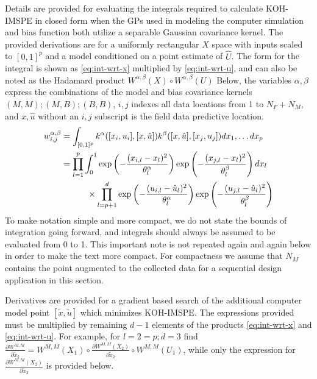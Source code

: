 \documentclass[
]{article}
\begin{document}
Details are provided for evaluating the integrals required to calculate
KOH-IMSPE in closed form when the GPs used in modeling the computer
simulation and bias function both utilize a separable Gaussian covariance kernel. The provided derivations are for a uniformly rectangular \(X\) space with inputs scaled to \([0,1]^p\) and a model conditioned on a point estimate of \(\hat{U}\). The form for the integral is shown as \eqref{eq:int-wrt-x} multiplied by \eqref{eq:int-wrt-u}, and can also be noted as the Hadamard product \(W^{\alpha, \beta}(X) \circ W^{\alpha, \beta}(U)\) Below, the variables \(\alpha,\beta\) express the combinations of the model and bias covariance kernels \((M,M); (M,B); (B,B)\), \(i,j\) indexes all data locations from 1 to \(N_F + N_M\), and \(x,\hat{u}\) without an \(i,j\) subscript is the field data predictive location.
\begin{align}
w^{\alpha, \beta}_{i,j} &= \int_{[0,1]^p} k^{\alpha}([x_i, u_i], [x, \hat{u}])k^{\beta}([x, \hat{u}], [x_j, u_j])dx_1, \dots dx_p \notag \\
&= \prod_{l = 1}^p \int_0^1 \exp\left(-\frac{(x_{i,l} - x_l)^2}{\theta^\alpha_l}\right)\exp\left(-\frac{(x_{j,l} - x_l)^2}{\theta^\beta_l}\right)dx_l \label{eq:int-wrt-x}\\
&\qquad\quad\times\prod_{l = p + 1}^d \exp\left(-\frac{(u_{i,l} - \hat{u}_l)^2}{\theta^\alpha_l}\right)\exp\left(-\frac{(u_{j,l} - \hat{u}_l)^2}{\theta^\beta_l}\right) \label{eq:int-wrt-u}
\end{align}
To make notation simple and more compact, we do not state the bounds of integration going forward, and integrals should always be assumed to be evaluated from 0 to 1. This important note is not repeated again and again below in order to make the text more compact. For compactness we assume that \(N_M\) contains the point augmented to the collected data for a sequential design application in this section.

Derivatives are provided for a gradient based search of the additional computer model point \([\tilde{x},\tilde{u}]\) which minimizes KOH-IMSPE. The expressions provided must be multiplied by remaining \(d-1\) elements of the products \eqref{eq:int-wrt-x} and \eqref{eq:int-wrt-u}. For example, for \(l = 2 = p; d = 3\) find \(\frac{\partial W^{M,M}}{\partial \tilde{x}_2} = W^{M,M}(X_1) \circ \frac{\partial W^{M,M}(X_2)}{\partial \tilde{x}_2} \circ W^{M,M}(U_1)\), while only the expression for \(\frac{\partial W^{M,M}(X_2)}{\partial \tilde{x}_2}\) is provided below.
\end{document}
